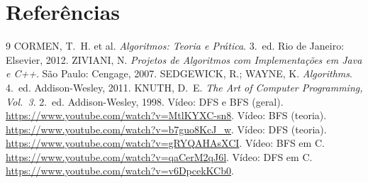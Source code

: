 \documentclass{SBCbookchapter}
\begin{document}
\section{Referências}
\begin{thebibliography}{9}
 CORMEN, T.~H. et al. \emph{Algoritmos: Teoria e
Prática}. 3.~ed. Rio de Janeiro: Elsevier, 2012.
 ZIVIANI, N. \emph{Projetos de Algoritmos com
Implementações em Java e C++}. São Paulo: Cengage, 2007.
 SEDGEWICK, R.; WAYNE, K. \emph{Algorithms}. 4.~ed.
Addison-Wesley, 2011.
 KNUTH, D.~E. \emph{The Art of Computer Programming,
Vol.~3}. 2.~ed. Addison-Wesley, 1998.
 Vídeo: DFS e BFS (geral).
\url{https://www.youtube.com/watch?v=MtlKYXC-sn8}.
 Vídeo: BFS (teoria).
\url{https://www.youtube.com/watch?v=b7guo8KcJ_w}.
 Vídeo: DFS (teoria).
\url{https://www.youtube.com/watch?v=gRYQAHAsXCI}.
 Vídeo: BFS em C.
\url{https://www.youtube.com/watch?v=qaCerM2qJ6l}.
 Vídeo: DFS em C.
\url{https://www.youtube.com/watch?v=v6DpcekKCb0}.
\end{thebibliography}
\end{document}
